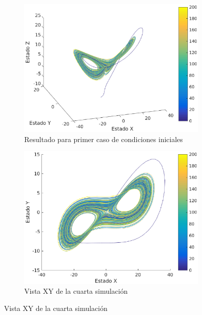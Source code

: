 \documentclass[12pt,letterpaper]{article}
\begin{document}

\begin{figure}
	\centering
	\begin{subfigure}[t]{0.36\textwidth}
		\includegraphics[width=\textwidth]{pictures/cuarta_simulacion}
		\caption{Resultado para primer caso de condiciones iniciales}
		\label{fig:simulacion4}
	\end{subfigure}
	\begin{subfigure}[t]{0.36\textwidth}
		\includegraphics[width=\textwidth]{pictures/cuarta_simulacion_xy}
		\caption{Vista XY de la cuarta simulación}
		\label{fig:simulacion4xy}
	\end{subfigure}

\end{figure}
\end{document}
